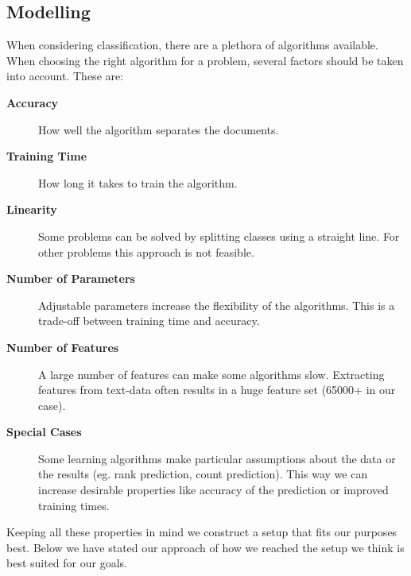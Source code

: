 \subsection{Modelling}
When considering classification, there are a plethora of algorithms available. When choosing the right algorithm for a problem, several factors should be taken into account\cite{MLCheatSheet}. These are:
    \begin{description}
        \item[\textbf{Accuracy}] How well the algorithm separates the documents.
        \item[\textbf{Training Time}] How long it takes to train the algorithm.
        \item[\textbf{Linearity}] Some problems can be solved by splitting classes using a straight line. For other problems this approach is not feasible.
        \item[\textbf{Number of Parameters}] Adjustable parameters increase the flexibility of the algorithms. This is a trade-off between training time and accuracy.
        \item[\textbf{Number of Features}] A large number of features can make some algorithms slow. Extracting features from text-data often results in a huge feature set (65000+ in our case).
        \item[\textbf{Special Cases}] Some learning algorithms make particular assumptions about the data or the results (eg. rank prediction, count prediction). This way we can increase desirable properties like accuracy of the prediction or improved training times. 
    \end{description}

Keeping all these properties in mind we construct a setup that fits our purposes best.
Below we have stated our approach of how we reached the setup we think is best suited for our goals.


